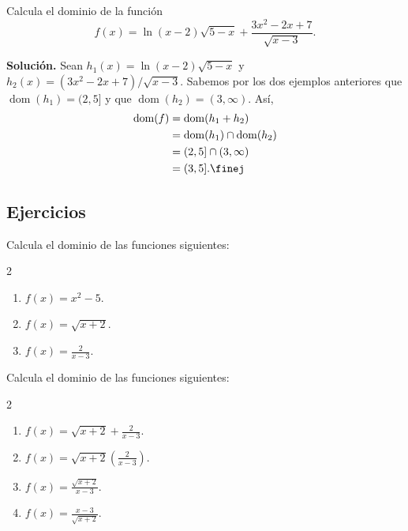 \documentclass[12pt,a4paper]{book}
\DeclareMathOperator{\dom}{dom}
\begin{document}
    \begin{ejemplo}\label{ejm:20}
        Calcula el dominio de la función
        \begin{equation*}
            f(x)=\ln(x-2)\sqrt{5-x}+\frac{3x^{2}-2x+7}{\sqrt{x-3}}.
        \end{equation*}

        \textbf{Solución.} Sean $h_{1}(x)=\ln(x-2)\sqrt{5-x}$ y $h_{2}(x)=\left(3x^{2}-2x+7\right)/\sqrt{x-3}$.
        Sabemos por los dos ejemplos anteriores que $\dom(h_{1})=(2,5]$ y que
        $\dom(h_{2})=(3,\infty)$. Así,
        \begin{align*}
            \dom(f)&=\dom(h_{1}+h_{2})\\
            &=\dom(h_{1})\cap\dom(h_{2})\\
            &=(2,5]\cap(3,\infty)\\
            &=(3,5].\finej
        \end{align*}
    \end{ejemplo}

    \par{}\subsection*{Ejercicios}

    \begin{ejercicio}\label{ej:88}
        Calcula el dominio de las funciones siguientes:
        \begin{multicols}{2}
        \begin{enumerate}[nosep]
            \item $f(x)=x^{2}-5$.
            \item $f(x)=\sqrt{x+2}$.
            \item $f(x)=\frac{2}{x-3}$.
        \end{enumerate}
        \end{multicols}
    \end{ejercicio}

    \begin{ejercicio}\label{ej:89}
        Calcula el dominio de las funciones siguientes:
        \begin{multicols}{2}
        \begin{enumerate}[nosep]
            \item $f(x)=\sqrt{x+2}+\frac{2}{x-3}$.
            \item $f(x)=\sqrt{x+2}\left(\frac{2}{x-3}\right)$.
            \item $f(x)=\frac{\sqrt{x+2}}{x-3}$.
            \item $f(x)=\frac{x-3}{\sqrt{x+2}}$.
        \end{enumerate}
        \end{multicols}
    \end{ejercicio}
\end{document}
